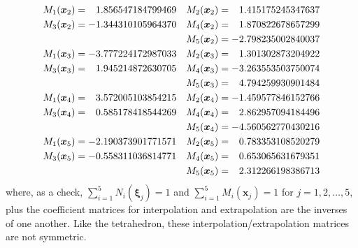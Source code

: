 \begin{subequations}
\begin{align}
    M_1 (\boldsymbol{x}_2) & = \phantom{-}1.856547184799469 & 
    M_2 (\boldsymbol{x}_2) & = \phantom{-}1.415175245347637 \notag \\
    M_3 (\boldsymbol{x}_2) & = -1.344310105964370 &
    M_4 (\boldsymbol{x}_2) & = \phantom{-}1.870822678657299 \notag \\ & &
    M_5 (\boldsymbol{x}_2) & = -2.798235002840037 \\
    M_1 (\boldsymbol{x}_3) & = -3.777224172987033 & 
    M_2 (\boldsymbol{x}_3) & = \phantom{-}1.301302873204922 \notag \\
    M_3 (\boldsymbol{x}_3) & = \phantom{-}1.945214872630705 &
    M_4 (\boldsymbol{x}_3) & = -3.263553503750074 \notag \\ & &
    M_5 (\boldsymbol{x}_3) & = \phantom{-}4.794259930901484 \\
    M_1 (\boldsymbol{x}_4) & = \phantom{-}3.572005103854215  & 
    M_2 (\boldsymbol{x}_4) & = -1.459577846152766 \notag \\
    M_3 (\boldsymbol{x}_4) & = \phantom{-}0.585178418544269 &
    M_4 (\boldsymbol{x}_4) & = \phantom{-}2.862957094184496 \notag \\ & &
    M_5 (\boldsymbol{x}_4) & = -4.560562770430216 \\
    M_1 (\boldsymbol{x}_5) & = -2.190373901771571 & 
    M_2 (\boldsymbol{x}_5) & = \phantom{-}0.783353108520279 \notag \\
    M_3 (\boldsymbol{x}_5) & = -0.558311036814771 &
    M_4 (\boldsymbol{x}_5) & = \phantom{-}0.653065631679351 \notag \\ & &
    M_5 (\boldsymbol{x}_5) & = \phantom{-}2.312266198386713 
    \end{align}
\end{subequations}
where, as a check, $\sum_{i=1}^5 N_i (\boldsymbol{\xi}_j) = 1$ and $\sum_{i=1}^5 M_i (\boldsymbol{x}_j) = 1$ for $j=1,2,\ldots,5$, plus the coefficient matrices for interpolation and extrapolation are the inverses of one another.   Like the tetrahedron, these interpolation\slash extrapolation matrices are not symmetric. 

